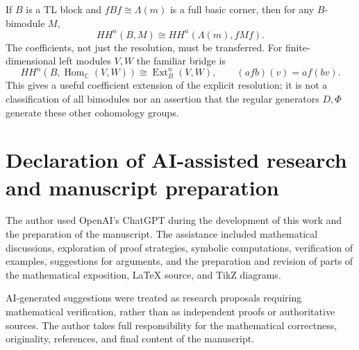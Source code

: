 \documentclass[a4paper,11pt,oneside,reqno]{amsart}
\theoremstyle{definition}
\numberwithin{equation}{section}
\begin{document}
	If $B$ is a TL block and $fBf\cong\Lambda(m)$ is a full basic corner,
	then for any $B$-bimodule $M$,
	\[
	HH^n(B,M)\cong HH^n(\Lambda(m),fMf).
	\]
	The coefficients, not just the resolution, must be transferred.
	For finite-dimensional left modules $V,W$ the familiar bridge is
	\[
	HH^n(B,\operatorname{Hom}_{\mathbb C}(V,W))
	\cong\operatorname{Ext}_B^n(V,W),
	\qquad (afb)(v)=a f(bv).
	\]
	This gives a useful coefficient extension of the explicit resolution;
	it is not a classification of all bimodules nor an assertion that
	the regular generators $D,\Phi$ generate these other cohomology groups.
	


\section*{Declaration of AI-assisted research and manuscript preparation}

The author used OpenAI's ChatGPT during the development of this work and the preparation of the manuscript. The assistance included mathematical discussions, exploration of proof strategies, symbolic computations, verification of examples, suggestions for arguments, and the preparation and revision of parts of the mathematical exposition, LaTeX source, and TikZ diagrams.

AI-generated suggestions were treated as research proposals requiring mathematical verification, rather than as independent proofs or authoritative sources. The author takes full responsibility for the mathematical correctness, originality, references, and final content of the manuscript.
\end{document}

